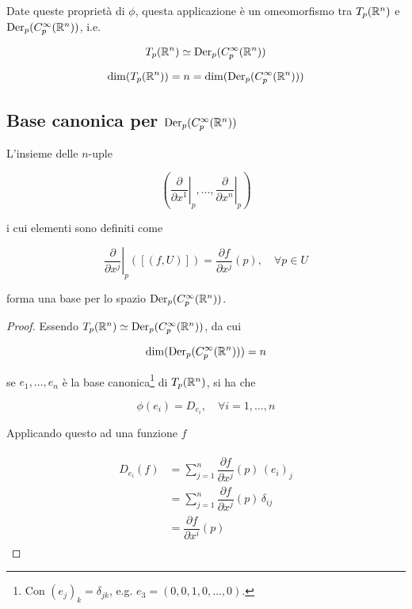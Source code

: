Date queste proprietà di $ \phi $, questa applicazione è un omeomorfismo tra $ T_{p}(\mathbb{R}^{n}) $ e $ \operatorname{Der}_{p}(C_{p}^{\infty}(\mathbb{R}^{n})) $, i.e.

\begin{equation}
	T_{p}(\mathbb{R}^{n}) \simeq \operatorname{Der}_{p}(C_{p}^{\infty}(\mathbb{R}^{n}))
\end{equation}

\begin{corollary}
	\begin{equation}
		\dim ( T_{p}(\mathbb{R}^{n}) ) = n = \dim ( \operatorname{Der}_{p}(C_{p}^{\infty}(\mathbb{R}^{n})) )
	\end{equation}
\end{corollary}

\subsection{Base canonica per $ \operatorname{Der}_{p}(C_{p}^{\infty}(\mathbb{R}^{n})) $}

L'insieme delle $ n $-uple

\begin{equation}
	\left( \left. \dfrac{\partial}{\partial x^{1}} \right|_{p},\dots,\left. \dfrac{\partial}{\partial x^{n}} \right|_{p} \right)
\end{equation}

i cui elementi sono definiti come

\begin{equation}
	\left. \dfrac{\partial}{\partial x^{j}} \right|_{p} ([(f,U)]) = \dfrac{\partial f}{\partial x^{j}} (p), \quad \forall p \in U
\end{equation}

forma una base per lo spazio $ \operatorname{Der}_{p}(C_{p}^{\infty}(\mathbb{R}^{n})) $.

\begin{proof}
	Essendo $ T_{p}(\mathbb{R}^{n}) \simeq \operatorname{Der}_{p}(C_{p}^{\infty}(\mathbb{R}^{n})) $, da cui
	
	\begin{equation}
		\dim ( \operatorname{Der}_{p}(C_{p}^{\infty}(\mathbb{R}^{n})) ) = n
	\end{equation}
		
	se $ e_{1},\dots,e_{n} $ è la base canonica\footnote{%
		Con $ (e_{j})_{k} = \delta_{jk} $, e.g. $ e_{3} = (0,0,1,0,\dots,0) $.%
	} di $ T_{p}(\mathbb{R}^{n}) $, si ha che

	\begin{equation}
		\phi(e_{i}) = D_{e_{i}}, \quad \forall i=1,\dots,n
	\end{equation}

	Applicando questo ad una funzione $ f $
	
	\begin{align}
		\begin{split}
			D_{e_{i}} (f) &= \sum_{j=1}^{n} \dfrac{\partial f}{\partial x^{j}} (p) \, (e_{i})_{j}\\
			&= \sum_{j=1}^{n} \dfrac{\partial f}{\partial x^{j}} (p) \, \delta_{ij}\\
			&= \dfrac{\partial f}{\partial x^{i}} (p)
		\end{split}
	\end{align}
\end{proof}


